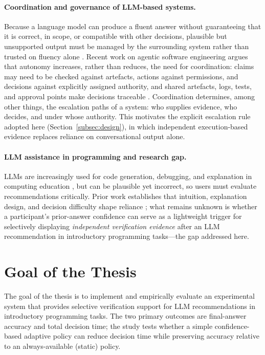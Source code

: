 \documentclass[oneside,final,14pt,a4paper]{extreport}
\begin{document}
\paragraph{Coordination and governance of LLM-based systems.}
Because a language model can produce a fluent answer without guaranteeing that
it is correct, in scope, or compatible with other decisions, plausible but
unsupported output must be managed by the surrounding system rather than
trusted on fluency alone \cite{Ciancarini2027}. Recent work on agentic software
engineering argues that autonomy increases, rather than reduces, the need for
coordination: claims may need to be checked against artefacts, actions against
permissions, and decisions against explicitly assigned authority, and shared
artefacts, logs, tests, and approval points make decisions traceable
\cite{Ciancarini2027}. Coordination determines, among other things, the
escalation paths of a system: who supplies evidence, who decides, and under
whose authority. This motivates the explicit escalation rule adopted here
(Section~\ref{subsec:design}), in which independent execution-based evidence
replaces reliance on conversational
output alone.

\paragraph{LLM assistance in programming and research gap.}
LLMs are increasingly used for code generation, debugging, and explanation in
computing education \cite{Ma2024,Cambaz2024,Denny2024}, but can be plausible
yet incorrect, so users must evaluate recommendations critically. Prior work
establishes that intuition, explanation design, and decision difficulty shape
reliance \cite{Chen2023,Vasconcelos2022,Zhang2024Verify}; what remains
unknown is whether a participant's prior-answer confidence can serve as a
lightweight trigger for selectively displaying \emph{independent verification
evidence} after an LLM recommendation in introductory programming
tasks---the gap addressed here.


\section{Goal of the Thesis}

The goal of the thesis is to implement and empirically evaluate an
experimental system that provides selective verification support for LLM
recommendations in introductory programming tasks. The two primary outcomes are
final-answer accuracy and total decision time; the study tests whether a simple
confidence-based adaptive policy can reduce decision time while preserving
accuracy relative to an always-available (static) policy.
\end{document}
